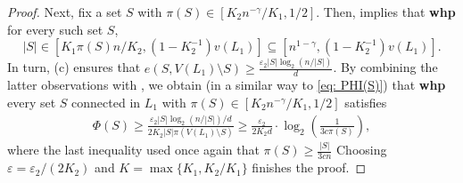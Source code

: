 \documentclass[reqno,final,a4paper]{amsart}
\theoremstyle{definition}
\newcommand{\whp}{%
    \textbf{whp}
}
\def\eps{\varepsilon}
\newcommand{\1}{\mathbbm{1}}
\begin{document}
\begin{proof}
Next, fix a set $S$ with $\pi(S)\in [K_2 n^{-\gamma}/K_1,1/2]$. 
Then,  implies that \textbf{whp} for every such set $S$,
\[|S|\in [K_1 \pi(S)n/K_2, (1-K_2^{-1})v(L_1)]\subseteq [n^{1-\gamma},(1-K_2^{-1})v(L_1)].\] 
In turn, (c) ensures that $e(S,V(L_1)\setminus S)\ge \frac{\eps_2 |S|\log_2(n/|S|)}{d}$.
By combining the latter observations with , we obtain (in a similar way to \eqref{eq: PHI(S)}) that \whp every set $S$ connected in $L_1$ with $\pi(S)\in[K_2 n^{-\gamma}/K_1,1/2]$ satisfies
\begin{align*}
    \Phi(S)\ge \frac{\eps_2 |S|\log_2(n/|S|)/d}{2K_2|S|\pi(V(L_1)\setminus S)}\ge  \frac{\eps_2}{2K_2d}\cdot\log_2\left(\frac{1}{3c\pi(S)}\right),
\end{align*}
where the last inequality used once again that $\pi(S)\ge \frac{|S|}{3cn}$
Choosing $\eps=\eps_2/(2K_2)$ and $K=\max\{K_1,K_2/K_1\}$ finishes the proof.
\end{proof}
\end{document}
